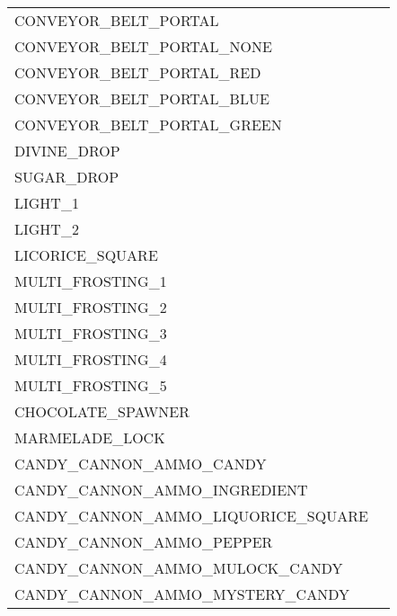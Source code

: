 \begin{tabular}{l l}
    CONVEYOR\_BELT\_PORTAL \\ 
    CONVEYOR\_BELT\_PORTAL\_NONE \\ 
    CONVEYOR\_BELT\_PORTAL\_RED \\   
    CONVEYOR\_BELT\_PORTAL\_BLUE \\   
    CONVEYOR\_BELT\_PORTAL\_GREEN \\   

    DIVINE\_DROP \\   
    SUGAR\_DROP \\ 
    LIGHT\_1 \\   
    LIGHT\_2 \\  
    
    LICORICE\_SQUARE \\   
    MULTI\_FROSTING\_1 \\   
    MULTI\_FROSTING\_2 \\   
    MULTI\_FROSTING\_3 \\   
    MULTI\_FROSTING\_4 \\   
    MULTI\_FROSTING\_5 \\   
    CHOCOLATE\_SPAWNER \\   
    MARMELADE\_LOCK \\   
    CANDY\_CANNON\_AMMO\_CANDY \\ 
    CANDY\_CANNON\_AMMO\_INGREDIENT \\ 
    CANDY\_CANNON\_AMMO\_LIQUORICE\_SQUARE \\ 
    CANDY\_CANNON\_AMMO\_PEPPER \\ 
    CANDY\_CANNON\_AMMO\_MULOCK\_CANDY \\ 
    CANDY\_CANNON\_AMMO\_MYSTERY\_CANDY \\ 
      
    \bottomrule
    \end{tabular}
